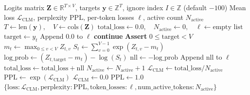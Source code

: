 \documentclass[11pt,a4paper]{article}
\theoremstyle{definition}
\begin{document}
\begin{algorithm}[H]
\caption{Causal Language Modeling Loss and Perplexity Evaluation}
\label{alg:clm}
\begin{algorithmic}[1]
\Require Logits matrix $\mathbf{Z} \in \mathbb{R}^{T \times V}$, targets $\mathbf{y} \in \mathbb{Z}^T$, ignore index $I \in \mathbb{Z}$ (default $-100$)
\Ensure Mean loss $\mathcal{L}_{\text{CLM}}$, perplexity $\text{PPL}$, per-token losses $\boldsymbol{\ell}$, active count $N_{\text{active}}$
\State $T \gets \text{len}(\mathbf{y}), \quad V \gets \text{cols}(\mathbf{Z})$
\State $\text{total\_loss} \gets 0.0, \quad N_{\text{active}} \gets 0, \quad \boldsymbol{\ell} \gets \text{empty list}$
    \State $\text{target} \gets y_t$
        \State Append $0.0$ to $\boldsymbol{\ell}$
        \State \textbf{continue}
    \EndIf
    \State \textbf{Assert} $0 \le \text{target} < V$ 
    \State $m_t \gets \max_{0 \le v < V} Z_{t, v}$ 
    \State $S_t \gets \sum_{v=0}^{V-1} \exp(Z_{t, v} - m_t)$ 
    \State $\text{log\_prob} \gets (Z_{t, \text{target}} - m_t) - \log(S_t)$ 
    \State $\text{nll} \gets -\text{log\_prob}$
    \State Append $\text{nll}$ to $\boldsymbol{\ell}$
    \State $\text{total\_loss} \gets \text{total\_loss} + \text{nll}$
    \State $N_{\text{active}} \gets N_{\text{active}} + 1$
\EndFor
{}
    \State $\mathcal{L}_{\text{CLM}} \gets \text{total\_loss} / N_{\text{active}}$
    \State $\text{PPL} \gets \exp(\mathcal{L}_{\text{CLM}})$
\Else
    \State $\mathcal{L}_{\text{CLM}} \gets 0.0$
    \State $\text{PPL} \gets 1.0$
\EndIf
\State \Return $\{\text{loss}: \mathcal{L}_{\text{CLM}}, \text{perplexity}: \text{PPL}, \text{token\_losses}: \boldsymbol{\ell}, \text{num\_active\_tokens}: N_{\text{active}}\}$
\end{algorithmic}
\end{algorithm}
\end{document}
